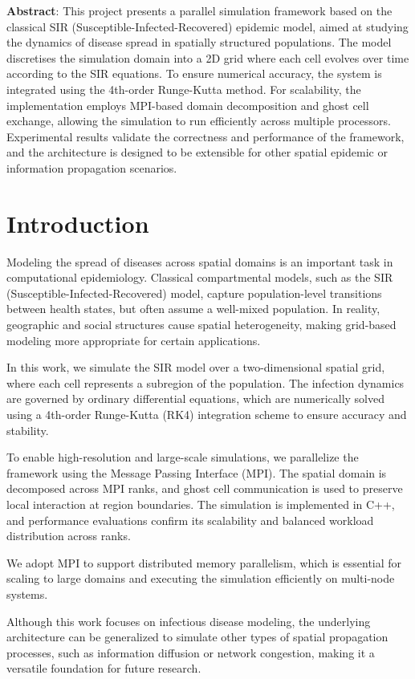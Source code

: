 \textbf{Abstract}:  
This project presents a parallel simulation framework based on the classical SIR (Susceptible-Infected-Recovered) epidemic model, aimed at studying the dynamics of disease spread in spatially structured populations. The model discretises the simulation domain into a 2D grid where each cell evolves over time according to the SIR equations. To ensure numerical accuracy, the system is integrated using the 4th-order Runge-Kutta method. For scalability, the implementation employs MPI-based domain decomposition and ghost cell exchange, allowing the simulation to run efficiently across multiple processors. Experimental results validate the correctness and performance of the framework, and the architecture is designed to be extensible for other spatial epidemic or information propagation scenarios.

\section{Introduction}

Modeling the spread of diseases across spatial domains is an important task in computational epidemiology. Classical compartmental models, such as the SIR (Susceptible-Infected-Recovered) model, capture population-level transitions between health states, but often assume a well-mixed population. In reality, geographic and social structures cause spatial heterogeneity, making grid-based modeling more appropriate for certain applications.

In this work, we simulate the SIR model over a two-dimensional spatial grid, where each cell represents a subregion of the population. The infection dynamics are governed by ordinary differential equations, which are numerically solved using a 4th-order Runge-Kutta (RK4) integration scheme to ensure accuracy and stability.

To enable high-resolution and large-scale simulations, we parallelize the framework using the Message Passing Interface (MPI). The spatial domain is decomposed across MPI ranks, and ghost cell communication is used to preserve local interaction at region boundaries. The simulation is implemented in C++, and performance evaluations confirm its scalability and balanced workload distribution across ranks.

We adopt MPI to support distributed memory parallelism, which is essential for scaling to large domains and executing the simulation efficiently on multi-node systems.

Although this work focuses on infectious disease modeling, the underlying architecture can be generalized to simulate other types of spatial propagation processes, such as information diffusion or network congestion, making it a versatile foundation for future research.


